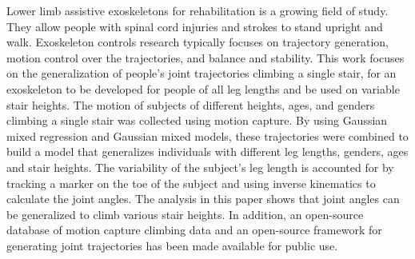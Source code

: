 

Lower limb assistive exoskeletons for rehabilitation is a growing field of study. They allow people with spinal cord injuries and strokes to stand upright and walk. Exoskeleton controls research typically focuses on trajectory generation, motion control over the trajectories, and balance and stability. This work focuses on the generalization of people's joint trajectories climbing a single stair, for an exoskeleton to be developed for people of all leg lengths and be used on variable stair heights. The motion of subjects of different heights, ages, and genders climbing a single stair was collected using motion capture. By using Gaussian mixed regression and Gaussian mixed models, these trajectories were combined to build a model that generalizes individuals with different leg lengths, genders, ages and stair heights. The variability of the subject's leg length is accounted for by tracking a marker on the toe of the subject and using inverse kinematics to calculate the joint angles. The analysis in this paper shows that joint angles can be generalized to climb various stair heights. In addition, an open-source database of motion capture climbing data and an open-source framework for generating joint trajectories has been made available for public use.


